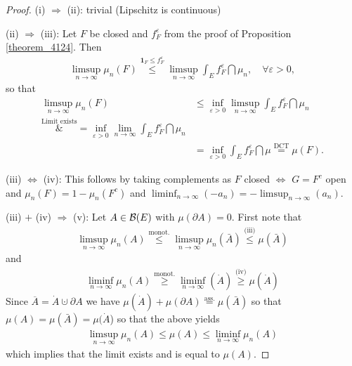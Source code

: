 \begin{proof}[Proof]

	(i) $\Rightarrow$ (ii): trivial (Lipschitz is continuous)\smallskip
	
	(ii) $\Rightarrow$ (iii): Let $F$ be closed and $f_F^{\varepsilon}$ from the proof of Proposition \ref{theorem_4124}. Then
	\begin{align*}
	 	\limsup\limits_{n\to\infty} \mu_n(F) \overset{\mathbf 1_F\leq f_F^\varepsilon}{\leq} \limsup\limits_{n\to\infty} \int_E f_F^{\varepsilon}\dint \mu_n,\quad \forall \varepsilon >0,
	\end{align*}	
		 so that
	\begin{align*}
		\limsup\limits_{n\to\infty} \mu_n(F) &\leq \inf_{\varepsilon > 0} \limsup\limits_{n\to\infty} \int_E f_F^{\varepsilon} \dint \mu_n \\
		\overset{\text{Limit exists}}&{=} \inf_{\varepsilon > 0} \lim\limits_{n\to\infty} \int_E f_F^{\varepsilon} \dint \mu_n \\
		&= \inf_{\varepsilon > 0} \int_E f_F^{\varepsilon} \dint \mu 
		\overset{\text{DCT}}{=} \mu(F).
	\end{align*}
	
	(iii) $\Leftrightarrow$ (iv): This follows by taking complements as $F$ closed $\Leftrightarrow$ $G = F^c$ open and $\mu_n(F) = 1 - \mu_n(F^c)$ and $\liminf_{n\to\infty}(-a_n) = -\limsup_{n\to\infty}(a_n)$.\smallskip
	
	(iii) $+$ (iv) $\Rightarrow$ (v): Let $A\in \mathcal{B}(E)$ with $\mu(\partial A) = 0$. First note that 
	\begin{align*}
		 \limsup_{n\to\infty} \mu_n(A) \overset{\text{monot.}}{\leq} \limsup_{n\to\infty} \mu_n({\bar{A}})\overset{\text{(iii)}}{\leq} \mu(\bar{A})
	\end{align*}
	and
	\begin{align*}
		 \liminf_{n\to\infty}\mu_n(A) \overset{\text{monot.}}{\geq} \liminf_{n\to\infty}(\dot{A}) \overset{\text{(iv)}}{\geq}  \mu(\dot{A})
	\end{align*}
	Since $\overline{A} = \dot{A} \cupdot \partial A$ we have $\mu(\dot{A}) + \mu(\partial A) \overset{\text{ass.}}{=} \mu(\bar{A})$ so that $\mu(A)=\mu(\bar A)=\mu(\dot A$) so that the above yields
	\begin{align*}
		 \limsup_{n\to\infty} \mu_n(A)\leq \mu(A) \leq  \liminf_{n\to\infty} \mu_n(A)
	\end{align*}
	which implies that the limit exists and is equal to $\mu(A)$.\smallskip	
	

\end{proof}
